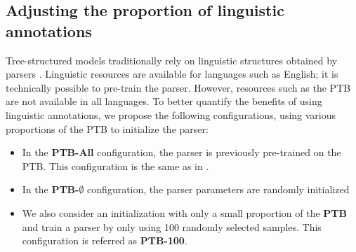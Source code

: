 \subsection{Adjusting the proportion of linguistic annotations} 

Tree-structured models traditionally rely on linguistic structures obtained by parsers \parencite{tai_15}. Linguistic resources are available for languages such as English; it is technically possible to pre-train the parser. However, resources such as the PTB are not available in all languages. To better quantify the benefits of using linguistic annotations, we propose the following configurations, using various proportions of the PTB to initialize the parser:

\begin{itemize}
    \item In the \textbf{PTB-All} configuration, the parser is previously pre-trained on the PTB. This configuration is the same as in .
    \item In the \textbf{PTB-$\emptyset$} configuration, the parser parameters are randomly initialized
    \item We also consider an initialization with only a small proportion of the \textbf{PTB} and train a parser by only using 100 randomly selected samples. This configuration is referred as \textbf{PTB-100}.
\end{itemize}




